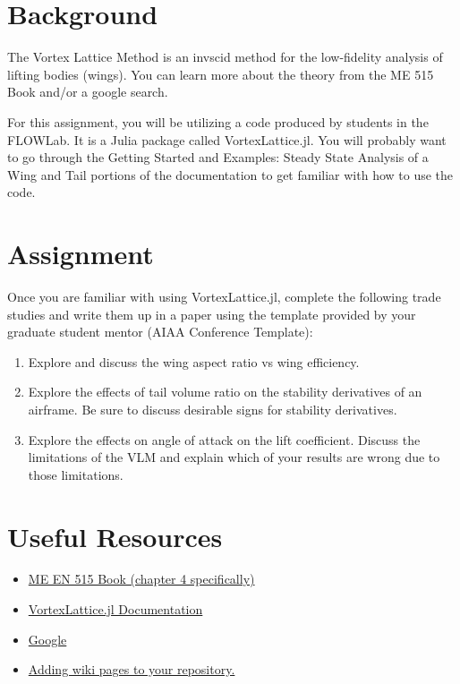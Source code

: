 \documentclass[12pt]{article}
\begin{document}
	
\section{Background}

	The Vortex Lattice Method is an invscid method for the low-fidelity analysis of lifting bodies (wings).
	You can learn more about the theory from the ME 515 Book and/or a google search.
	
	For this assignment, you will be utilizing a code produced by students in the FLOWLab.
	It is a Julia package called VortexLattice.jl.
	You will probably want to go through the Getting Started and Examples: Steady State Analysis of a Wing and Tail portions of the documentation to get familiar with how to use the code.
	
	
\section{Assignment}
	Once you are familiar with using VortexLattice.jl, complete the following trade studies and write them up in a paper using the template provided by your graduate student mentor (AIAA Conference Template):
	
	\begin{enumerate}
		\item Explore and discuss the wing aspect ratio vs wing efficiency. 
		\item Explore the effects of tail volume ratio on the stability derivatives of an airframe. Be sure to discuss desirable signs for stability derivatives.
		\item Explore the effects on angle of attack on the lift coefficient. Discuss the limitations of the VLM and explain which of your results are wrong due to those limitations.
	\end{enumerate}





\section{Useful Resources}

\begin{itemize}
	\item \href{https://byu.box.com/shared/static/ywfayozbj3sr2ot6b32u8nqk5brqvurt.pdf}{ME EN 515 Book (chapter 4 specifically)}
	\item \href{https://flow.byu.edu/VortexLattice.jl/stable/}{VortexLattice.jl Documentation}
	\item \href{https://letmegooglethat.com/?q=what+is+the+vertical+tail+volume+ratio+formula}{Google}
	\item \href{https://docs.github.com/en/communities/documenting-your-project-with-wikis/adding-or-editing-wiki-pages}{Adding wiki pages to your repository.}
\end{itemize}
\end{document}
